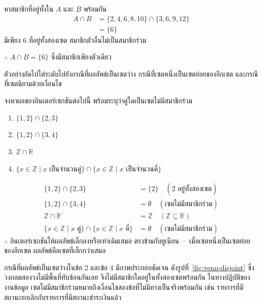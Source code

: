 \begin{solution}
หาสมาชิกที่อยู่ทั้งใน $A$ และ $B$ พร้อมกัน
\begin{align*}
A \cap B &= \{2,4,6,8,10\} \cap \{3,6,9,12\}\\
         &= \{6\}
\end{align*}
มีเพียง 6 ที่อยู่ทั้งสองเซต สมาชิกตัวอื่นไม่เป็นสมาชิกร่วม

$\therefore$ $A \cap B = \{6\}$ ซึ่งมีสมาชิกเพียงตัวเดียว
\solhere
\end{solution}

ตัวอย่างถัดไปไต่ระดับไปยังกรณีที่ผลลัพธ์เป็นเซตว่าง กรณีที่เซตหนึ่งเป็นเซตย่อยของอีกเซต และกรณีที่เซตนิยามด้วยเงื่อนไข

\begin{ex}
\label{ex:intersection-cases}
จงหาผลของอินเตอร์เซกชันต่อไปนี้ พร้อมระบุว่าคู่ใดเป็นเซตไม่มีสมาชิกร่วม
\begin{enumerate}
    \item $\{1, 2\} \cap \{2, 3\}$
    \item $\{1, 2\} \cap \{3, 4\}$
    \item $\mathbb{Z} \cap \mathbb{R}$
    \item $\{x \in \mathbb{Z} \mid x \text{ เป็นจำนวนคู่}\} \cap \{x \in \mathbb{Z} \mid x \text{ เป็นจำนวนคี่}\}$
\end{enumerate}
\end{ex}
\begin{solution}
\begin{align*}
\{1,2\} \cap \{2,3\} &= \{2\} \quad (2 \text{ อยู่ทั้งสองเซต})\\
\{1,2\} \cap \{3,4\} &= \emptyset \quad (\text{เซตไม่มีสมาชิกร่วม})\\
\mathbb{Z} \cap \mathbb{R} &= \mathbb{Z} \quad (\mathbb{Z} \subseteq \mathbb{R})\\
\{x \in \mathbb{Z} \mid x \text{ คู่}\} \cap \{x \in \mathbb{Z} \mid x \text{ คี่}\} &= \emptyset \quad (\text{เซตไม่มีสมาชิกร่วม})
\end{align*}
$\therefore$ อินเตอร์เซกชันให้ผลลัพธ์เล็กลงหรือเท่าเดิมเสมอ ตรงข้ามกับยูเนียน · เมื่อเซตหนึ่งเป็นเซตย่อยของอีกเซต ผลลัพธ์คือเซตที่เล็กกว่าเสมอ \solhere
\end{solution}

กรณีที่ผลลัพธ์เป็นเซตว่างในข้อ 2 และข้อ 4 มีภาพประกอบชัดเจน ดังรูปที่~\ref{fig:venn-disjoint} ซึ่งวงกลมสองวงไม่มีพื้นที่ทับซ้อนกันเลย จึงไม่มีสมาชิกใดอยู่ในทั้งสองเซตพร้อมกัน ในทางปฏิบัติของงานข้อมูล เซตไม่มีสมาชิกร่วมหมายถึงเงื่อนไขสองข้อที่ไม่มีทางเป็นจริงพร้อมกัน เช่น รายการที่มีสถานะยกเลิกกับรายการที่มีสถานะชำระเงินแล้ว

